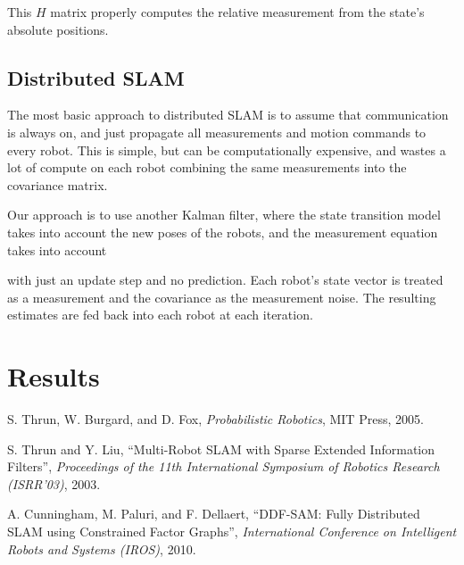 \documentclass[prodmode,acmtecs]{acmsmall} %
\begin{document}
This $H$ matrix properly computes the relative measurement from the state's absolute positions.

\subsection{Distributed SLAM}

The most basic approach to distributed SLAM is to assume that communication is always on, and just propagate all measurements and motion commands to every robot. This is simple, but can be computationally expensive, and wastes a lot of compute on each robot combining the same measurements into the covariance matrix.

Our approach is to use another Kalman filter, where the state transition model takes into account the new poses of the robots, and the measurement equation takes into account 

with just an update step and no prediction.  Each robot's state vector is treated as a measurement and the covariance as the measurement noise. The resulting estimates are fed back into each robot at each iteration.

\section{Results}

\begin{thebibliography}{12}
        S. Thrun, W. Burgard, and D. Fox, \emph{Probabilistic Robotics}, MIT Press, 2005.

        S. Thrun and Y. Liu, ``Multi-Robot SLAM with Sparse Extended Information Filters'', \emph{Proceedings of the 11th International Symposium of Robotics Research (ISRR'03)}, 2003.

        A. Cunningham, M. Paluri, and F. Dellaert, ``DDF-SAM: Fully Distributed SLAM using Constrained Factor Graphs'', \emph{International Conference on Intelligent Robots and Systems (IROS)}, 2010.

\end{thebibliography}
\end{document}
